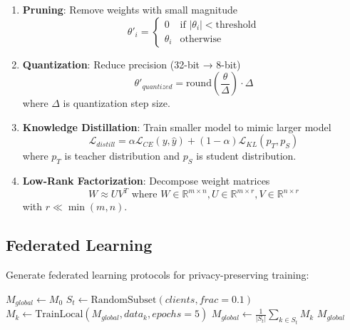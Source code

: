 \begin{enumerate}
    \item \textbf{Pruning}: Remove weights with small magnitude
    \begin{equation}
        \theta'_i = \begin{cases}
        0 & \text{if } |\theta_i| < \text{threshold} \\
        \theta_i & \text{otherwise}
        \end{cases}
    \end{equation}

    \item \textbf{Quantization}: Reduce precision (32-bit → 8-bit)
    \begin{equation}
        \theta'_{quantized} = \text{round}\left(\frac{\theta}{\Delta}\right) \cdot \Delta
    \end{equation}
    where $\Delta$ is quantization step size.

    \item \textbf{Knowledge Distillation}: Train smaller model to mimic larger model
    \begin{equation}
        \mathcal{L}_{distill} = \alpha \mathcal{L}_{CE}(y, \hat{y}) + (1-\alpha) \mathcal{L}_{KL}(p_T, p_S)
    \end{equation}
    where $p_T$ is teacher distribution and $p_S$ is student distribution.

    \item \textbf{Low-Rank Factorization}: Decompose weight matrices
    \begin{equation}
        W \approx U V^T \text{ where } W \in \mathbb{R}^{m \times n}, U \in \mathbb{R}^{m \times r}, V \in \mathbb{R}^{n \times r}
    \end{equation}
    with $r \ll \min(m, n)$.
\end{enumerate}

\subsection{Federated Learning}

Generate federated learning protocols for privacy-preserving training:

\begin{algorithm}
\caption{Federated Averaging}
\begin{algorithmic}[1]
    \State $M_{global} \gets M_0$ 
        \State $S_t \gets \text{RandomSubset}(clients, frac=0.1)$ 
            \State $M_k \gets \text{TrainLocal}(M_{global}, data_k, epochs=5)$
        \EndFor
        \State $M_{global} \gets \frac{1}{|S_t|} \sum_{k \in S_t} M_k$ 
    \EndFor
    \State \Return $M_{global}$
\EndProcedure
\end{algorithmic}
\end{algorithm}

